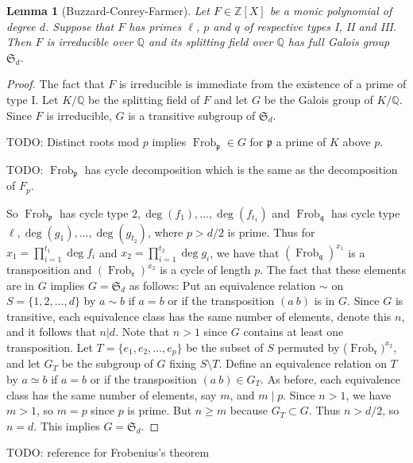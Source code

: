 \documentclass[11pt]{article}
\theoremstyle{plain}
\newtheorem{lemma}[theorem]{Lemma}
\theoremstyle{definition}
\theoremstyle{remark}
\numberwithin{equation}{section}
\newcommand{\ZZ}{\mathbb{Z}}
\newcommand{\QQ}{\mathbb{Q}}
\renewcommand{\SS}{\mathfrak{S}}
\newcommand{\Frob}{\operatorname{Frob}}
\begin{document}
\begin{lemma}[Buzzard-Conrey-Farmer]
  Let $F\in\ZZ[X]$ be a monic polynomial of degree $d$.  Suppose that $F$ has
  primes $\ell$, $p$ and $q$ of respective types I, II and III.  Then $F$
  is irreducible over $\QQ$ and its splitting field over $\QQ$ has full Galois
  group $\SS_d$.
\end{lemma}
\begin{proof}
  The fact that $F$ is irreducible is immediate from the existence of a prime of type
  I. 
  Let $K/\QQ$ be the splitting field of $F$ and let $G$ be the Galois group of
  $K/\QQ$.  Since $F$ is irreducible, $G$ is a transitive subgroup of $\SS_d$. 

  TODO: Distinct roots mod $p$ implies $\Frob_{\mathfrak{p}} \in G$ for
  $\mathfrak{p}$
  a prime of $K$ above $p$.

  TODO: $\Frob_{\mathfrak{p}}$ has cycle decomposition which is the same as the
  decomposition of $F_p$.

  So $\Frob_{\mathfrak{p}}$ has cycle type $2,\deg(f_1),\ldots,\deg(f_{t_1})$ and
  $\Frob_{\mathfrak{q}}$ has cycle type $\ell,\deg(g_1),\ldots,\deg(g_{t_2})$, where 
  $p>d/2$ is prime. Thus for $x_1=\prod_{i=1}^{t_1}\deg f_i$ and $x_2=\prod_{i=1}^{t_2}\deg g_i$,
  we have that $(\Frob_{\mathfrak{q}})^{x_1}$ is a transposition and 
  $(\Frob_{\mathfrak{r}})^{x_2}$
  is a cycle of length $p$. The fact that these elements are in $G$ implies $G=\SS_d$ as follows:
  Put an equivalence relation $\sim$ on $S=\{1,2,\ldots,d\}$ by $a\sim b$ if $a=b$ or if the
  transposition $(a~b)$ is in $G$. Since $G$ is
  transitive, each equivalence class has the same number of elements, denote this
  $n$, and it follows that $n|d$. Note that $n>1$ since $G$ contains at least one
  transposition. Let $T=\{e_1,e_2,\ldots,e_p\}$ be the subset of $S$ permuted by
  ($\Frob_{\mathfrak{r}})^{x_2}$, and let $G_T$ be the subgroup of $G$ fixing $S\setminus T$.
  Define an equivalence relation on $T$ by $a\simeq b$ if $a=b$ or if the transposition
  $(a~b) \in G_T$. As before, each equivalence class has the same number of elements,
  say $m$, and $m\mid p$. Since $n>1$, we have $m>1$, so $m=p$ since $p$ is prime.
  But $n\geq m$ because $G_T\subset G$. Thus $n>d/2$, so $n=d$. This implies $G=\SS_d$. 
\end{proof}

TODO: reference for Frobenius's theorem
\end{document}
